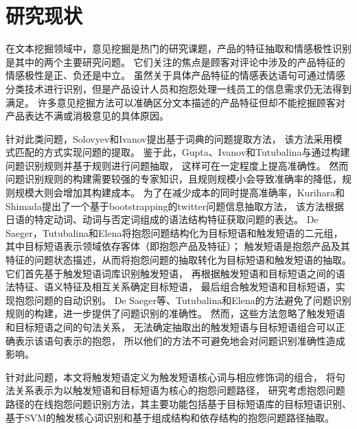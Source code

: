 \section{研究现状}\label{sec:1.2}
在文本挖掘领域中，意见挖掘是热门的研究课题，产品的特征抽取和情感极性识别是其中的两个主要研究问题\cite{hu2004mining,moghaddam2012aspect}。
它们关注的焦点是顾客对评论中涉及的产品特征的情感极性是正、负还是中立。
虽然关于具体产品特征的情感表达语句可通过情感分类技术进行识别，但是产品设计人员和抱怨处理一线员工的信息需求仍无法得到满足。
许多意见挖掘方法可以准确区分文本描述的产品特征但却不能挖掘顾客对产品表达不满或消极意见的具体原因。

针对此类问题，Solovyev和Ivanov\cite{solovyev2014dictionary}提出基于词典的问题提取方法，
该方法采用模式匹配的方式实现问题的提取。
鉴于此，Gupta\cite{gupta2011extracting}、Ivanov和Tutubalina\cite{ivanov2014clause}与通过构建问题识别规则并基于规则进行问题抽取，
这样可在一定程度上提高准确性。
然而问题识别规则的构建需要较强的专家知识，且规则规模小会导致准确率的降低，规则规模大则会增加其构建成本。
为了在减少成本的同时提高准确率，Kurihara和Shimada\cite{kurihara2015trouble}提出了一个基于bootstrapping的twitter问题信息抽取方法，
该方法根据日语的特定动词、动词与否定词组成的语法结构特征获取问题的表达。
De Saeger\cite{de2008looking}，Tutubalina和Elena\cite{tutubalina2015target,tutubalina2015dependency}将抱怨问题结构化为目标短语和触发短语的二元组，
其中目标短语表示领域依存客体（即抱怨产品及特征）；
触发短语是抱怨产品及其特征的问题状态描述，从而将抱怨问题的抽取转化为目标短语和触发短语的抽取。
它们首先基于触发短语词库识别触发短语，
再根据触发短语和目标短语之间的语法特征、语义特征及相互关系确定目标短语，
最后组合触发短语和目标短语，实现抱怨问题的自动识别。
De Saeger等、Tutubalina和Elena的方法避免了问题识别规则的构建，进一步提供了问题识别的准确性。
然而，这些方法忽略了触发短语和目标短语之间的句法关系，
无法确定抽取出的触发短语与目标短语组合可以正确表示该语句表示的抱怨，
所以他们的方法不可避免地会对问题识别准确性造成影响。

针对此问题，本文将触发短语定义为触发短语核心词与相应修饰词的组合，
将句法关系表示为以触发短语和目标短语为核心的抱怨问题路径，
研究考虑抱怨问题路径的在线抱怨问题识别方法，其主要功能包括基于目标短语库的目标短语识别、
基于SVM的触发核心词识别和基于组成结构和依存结构的抱怨问题路径抽取。